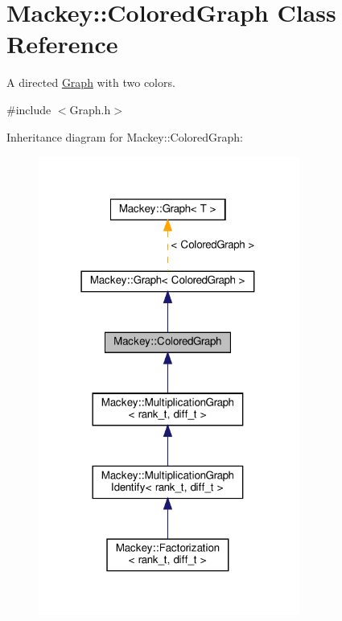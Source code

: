 \hypertarget{classMackey_1_1ColoredGraph}{}\section{Mackey\+:\+:Colored\+Graph Class Reference}
\label{classMackey_1_1ColoredGraph}


A directed \hyperlink{classMackey_1_1Graph}{Graph} with two colors.  




{\ttfamily \#include $<$Graph.\+h$>$}



Inheritance diagram for Mackey\+:\+:Colored\+Graph\+:\nopagebreak
\begin{figure}[H]
\begin{center}
\leavevmode
\includegraphics[width=243pt]{classMackey_1_1ColoredGraph__inherit__graph}
\end{center}
\end{figure}


